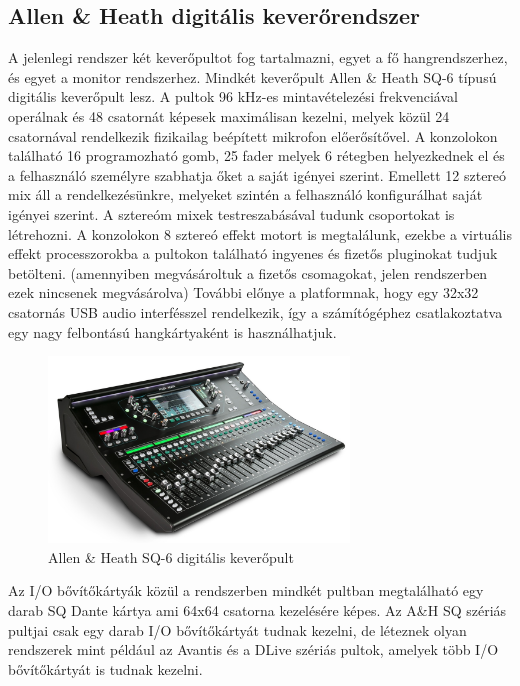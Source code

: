 \subsection{Allen \& Heath digitális keverőrendszer}
A jelenlegi rendszer két keverőpultot fog tartalmazni, egyet a fő hangrendszerhez, és egyet a monitor rendszerhez.
Mindkét keverőpult Allen \& Heath SQ-6 típusú digitális keverőpult lesz.
A pultok 96 kHz-es mintavételezési frekvenciával operálnak és 48 csatornát képesek maximálisan kezelni, melyek közül 
24 csatornával rendelkezik fizikailag beépített mikrofon előerősítővel. A konzolokon található 16 programozható gomb,
25 fader melyek 6 rétegben helyezkednek el és a felhasználó személyre szabhatja őket a saját igényei szerint. 
Emellett 12 sztereó mix áll a rendelkezésünkre, melyeket szintén a felhasználó konfigurálhat saját igényei szerint.
A sztereóm mixek testreszabásával tudunk csoportokat is létrehozni.
A konzolokon 8 sztereó effekt motort is megtalálunk, ezekbe a virtuális effekt processzorokba a pultokon található ingyenes és fizetős 
pluginokat tudjuk betölteni. (amennyiben megvásároltuk a fizetős csomagokat, jelen rendszerben ezek nincsenek megvásárolva)
További előnye a platformnak, hogy egy 32x32 csatornás USB audio interfésszel rendelkezik, így a számítógéphez csatlakoztatva
egy nagy felbontású hangkártyaként is használhatjuk. \cite{AHSQ}
\begin{figure}[H]
	\centering
	\includegraphics[width=80mm, keepaspectratio]{figures/sq6.jpg}
	\caption{Allen \& Heath SQ-6 digitális keverőpult}\label{fig:sq6}
\end{figure}
Az I/O bővítőkártyák közül a rendszerben mindkét pultban megtalálható egy darab SQ Dante kártya ami 64x64 csatorna
kezelésére képes. Az A\&H SQ szériás pultjai csak egy darab I/O bővítőkártyát tudnak kezelni, de léteznek
olyan rendszerek mint például az Avantis és a DLive szériás pultok, amelyek több I/O bővítőkártyát is tudnak kezelni.

